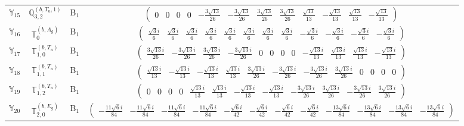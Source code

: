 \documentclass[fleqn,10pt,landscape]{article}
\begin{document}
\begin{itemize}
\begin{center}
\begin{longtable}{c|c|c|c}
$ \mathbb{Y}_{15} $ & $\mathbb{Q}_{3,2}^{(b,T_{u},1)}$ & B$_{1}$ & $\begin{pmatrix} 0 & 0 & 0 & 0 & - \frac{3 \sqrt{13}}{26} & - \frac{3 \sqrt{13}}{26} & \frac{3 \sqrt{13}}{26} & \frac{3 \sqrt{13}}{26} & \frac{\sqrt{13}}{13} & - \frac{\sqrt{13}}{13} & \frac{\sqrt{13}}{13} & - \frac{\sqrt{13}}{13} \end{pmatrix}$ \\
$ \mathbb{Y}_{16} $ & $\mathbb{T}_{0}^{(b,A_{g})}$ & B$_{1}$ & $\begin{pmatrix} \frac{\sqrt{3} i}{6} & \frac{\sqrt{3} i}{6} & \frac{\sqrt{3} i}{6} & \frac{\sqrt{3} i}{6} & \frac{\sqrt{3} i}{6} & \frac{\sqrt{3} i}{6} & \frac{\sqrt{3} i}{6} & \frac{\sqrt{3} i}{6} & - \frac{\sqrt{3} i}{6} & - \frac{\sqrt{3} i}{6} & - \frac{\sqrt{3} i}{6} & - \frac{\sqrt{3} i}{6} \end{pmatrix}$ \\
$ \mathbb{Y}_{17} $ & $\mathbb{T}_{1,0}^{(b,T_{u})}$ & B$_{1}$ & $\begin{pmatrix} \frac{3 \sqrt{13} i}{26} & - \frac{3 \sqrt{13} i}{26} & \frac{3 \sqrt{13} i}{26} & - \frac{3 \sqrt{13} i}{26} & 0 & 0 & 0 & 0 & - \frac{\sqrt{13} i}{13} & \frac{\sqrt{13} i}{13} & \frac{\sqrt{13} i}{13} & - \frac{\sqrt{13} i}{13} \end{pmatrix}$ \\
$ \mathbb{Y}_{18} $ & $\mathbb{T}_{1,1}^{(b,T_{u})}$ & B$_{1}$ & $\begin{pmatrix} \frac{\sqrt{13} i}{13} & - \frac{\sqrt{13} i}{13} & - \frac{\sqrt{13} i}{13} & \frac{\sqrt{13} i}{13} & \frac{3 \sqrt{13} i}{26} & - \frac{3 \sqrt{13} i}{26} & - \frac{3 \sqrt{13} i}{26} & \frac{3 \sqrt{13} i}{26} & 0 & 0 & 0 & 0 \end{pmatrix}$ \\
$ \mathbb{Y}_{19} $ & $\mathbb{T}_{1,2}^{(b,T_{u})}$ & B$_{1}$ & $\begin{pmatrix} 0 & 0 & 0 & 0 & \frac{\sqrt{13} i}{13} & \frac{\sqrt{13} i}{13} & - \frac{\sqrt{13} i}{13} & - \frac{\sqrt{13} i}{13} & - \frac{3 \sqrt{13} i}{26} & \frac{3 \sqrt{13} i}{26} & - \frac{3 \sqrt{13} i}{26} & \frac{3 \sqrt{13} i}{26} \end{pmatrix}$ \\
$ \mathbb{Y}_{20} $ & $\mathbb{T}_{2,0}^{(b,E_{g})}$ & B$_{1}$ & $\begin{pmatrix} - \frac{11 \sqrt{6} i}{84} & - \frac{11 \sqrt{6} i}{84} & - \frac{11 \sqrt{6} i}{84} & - \frac{11 \sqrt{6} i}{84} & - \frac{\sqrt{6} i}{42} & - \frac{\sqrt{6} i}{42} & - \frac{\sqrt{6} i}{42} & - \frac{\sqrt{6} i}{42} & - \frac{13 \sqrt{6} i}{84} & - \frac{13 \sqrt{6} i}{84} & - \frac{13 \sqrt{6} i}{84} & - \frac{13 \sqrt{6} i}{84} \end{pmatrix}$ \\

\end{longtable}
\end{center}
\end{itemize}
\end{document}
